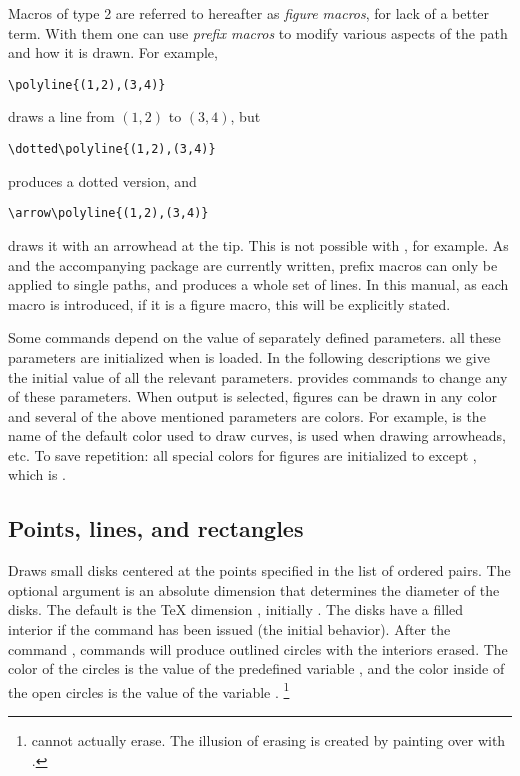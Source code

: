 \documentclass[letterpaper]{article}
\begin{document}
Macros of type 2 are referred to hereafter as \emph{figure macros}, for
lack of a better term. With them one can use \emph{prefix
macros} to modify various aspects of the path and
how it is drawn. For example,
\begin{verbatim}
\polyline{(1,2),(3,4)}
\end{verbatim}
draws a line from $(1,2)$ to $(3,4)$, but
\begin{verbatim}
\dotted\polyline{(1,2),(3,4)}
\end{verbatim}
produces a dotted version, and
\begin{verbatim}
\arrow\polyline{(1,2),(3,4)}
\end{verbatim}
draws it with an arrowhead at the tip. This is not possible with
, for example. As \mfp{} and the accompanying \MF{}
package \grafbase{} are currently written, prefix macros can only be
applied to single paths, and  produces a whole set of
lines. In this manual, as each macro is introduced, if it is a figure
macro, this will be explicitly stated.

Some commands depend on the value of separately defined parameters. all
these parameters are initialized when \mfp{} is loaded. In the following
descriptions we give the initial value of all the relevant parameters.
\Mfp{} provides commands to change any of these parameters. When \MP{}
output is selected, figures can be drawn in any color and several of the
above mentioned parameters are colors. For example,  is
the name of the default color used to draw curves,  is
used when drawing arrowheads, etc.  To save repetition: all special
colors for figures are initialized to  except
, which is .


\subsection{Points, lines, and rectangles}\label{points}

\begin{cd}
%
\end{cd}

Draws small disks centered at the points specified in the list of
ordered pairs. The optional argument  is an absolute
dimension that determines the diameter of the disks. The default is the
\TeX{} dimension , initially \dim{2pt}. The disks have a
filled interior if the command  has been issued (the
initial behavior). After the command , 
commands will produce outlined circles with the interiors erased. The
color of the circles is the value of the predefined variable
, and the color inside of the open circles is the value
of the variable .%
    \footnote{\MP{} cannot actually erase. The illusion of erasing is
    created by painting over with .}
\end{document}
